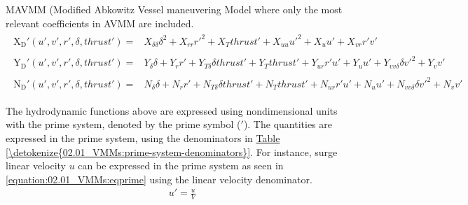 \documentclass[review]{elsarticle}
\begin{document}
MAVMM (Modified Abkowitz Vessel maneuvering Model where only the most relevant coefficients in AVMM are included.
\begin{equation}\label{equation:02.01_VMMs:eqxmartinssimple}
\begin{split}\begin{split}
\operatorname{X_{D}'}{\left(u',v',r',\delta,thrust' \right)} = & X_{\delta\delta} \delta^{2} + X_{rr} r'^{2} + X_{T} thrust' + X_{uu} u'^{2} + X_{u} u' + X_{vr} r' v' 
\end{split}\end{split}
\end{equation}\begin{equation}\label{equation:02.01_VMMs:eqymartinssimple}
\begin{split}\begin{split}
\operatorname{Y_{D}'}{\left(u',v',r',\delta,thrust' \right)} = & Y_{\delta} \delta + Y_{r} r' + Y_{T\delta} \delta thrust' + Y_{T} thrust' + Y_{ur} r' u' + Y_{u} u' + Y_{vv\delta} \delta v'^{2} + Y_{v} v' 
\end{split}\end{split}
\end{equation}\begin{equation}\label{equation:02.01_VMMs:eqnmartinssimple}
\begin{split}\begin{split}
\operatorname{N_{D}'}{\left(u',v',r',\delta,thrust' \right)} = & N_{\delta} \delta + N_{r} r' + N_{T\delta} \delta thrust' + N_{T} thrust' + N_{ur} r' u' + N_{u} u' + N_{vv\delta} \delta v'^{2} + N_{v} v' 
\end{split}\end{split}
\end{equation}
 
The hydrodynamic functions above are expressed using nondimensional units with the prime system, denoted by the prime symbol (\('\)). The quantities are expressed in the prime system, using the denominators in \hyperref[\detokenize{02.01_VMMs:prime-system-denominators}]{Table \ref{\detokenize{02.01_VMMs:prime-system-denominators}}}. For instance, surge linear velocity \(u\) can be expressed in the prime system as seen in \autoref{equation:02.01_VMMs:eqprime} using the linear velocity denominator.
\begin{equation}\label{equation:02.01_VMMs:eqprime}
\begin{split}\displaystyle u'=\frac{u}{V}\end{split}
\end{equation}
 
\end{document}
